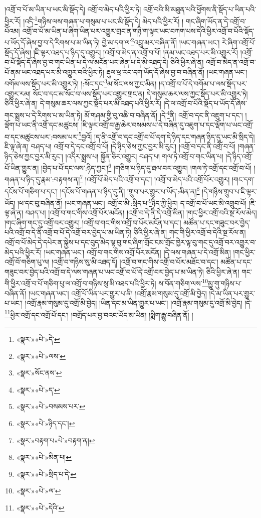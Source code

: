 །འགྲོ་བ་པོ་མ་ཡིན་པ་ཡང་མི་སྡོད་དེ། འགྲོ་བ་མེད་པའི་ཕྱིར་ཏེ། འགྲོ་བའི་མི་མཐུན་པའི་ཕྱོགས་ནི་སྡོད་པ་ཡིན་པའི་ཕྱིར་རོ། །འདི་\footnote{«སྣར་»«པེ་»དེ་}གཉིས་ལས་གཞན་པ་གསུམ་པ་ཡང་མི་སྡོད་དེ། མེད་པའི་ཕྱིར་རོ། །
གང་ཞིག་ཡོད་ན་དེ་འགྲོ་བ་པོའམ། འགྲོ་བ་པོ་མ་ཡིན་པ་ཞིག་ཡིན་པར་འགྱུར་གྲང་ན་གཉི་ག་ལྟར་ཡང་བཀག་པས་དེའི་ཕྱིར་འགྲོ་བ་པོའི་སྡོད་པ་ཡོད་དོ་ཞེས་བྱ་བ་དེ་རིགས་པ་མ་ཡིན་ཏེ། བྱེ་མ་དག་ལ་\footnote{«སྣར་»«པེ་»ལས་}འབྲུ་མར་བཞིན་ནོ། །ཡང་གཞན་ཡང་། རེ་ཞིག་འགྲོ་པོ་སྡོད་དོ་ཞེས། །ཇི་ལྟར་འཐད་པ་ཉིད་དུ་འགྱུར། །འགྲོ་བ་མེད་ན་འགྲོ་བ་པོ། །ནམ་ཡང་འཐད་པར་མི་འགྱུར་རོ། །འགྲོ་བ་པོ་སྡོད་དོ་ཞེས་བྱ་བ་གང་ཡིན་པ་དེ་ལ་མངོན་པར་ཞེན་པ་དེ་མི་འཐད་དེ། ཅིའི་ཕྱིར་ཞེ་ན། འགྲོ་བ་མེད་ན་འགྲོ་བ་པོ་ནམ་ཡང་འཐད་པར་མི་འགྱུར་བའི་ཕྱིར་ཏེ། རྡུལ་ཕྲ་རབ་དག་ཡོད་དོ་ཞེས་བྱ་བ་བཞིན་ནོ། །ཡང་གཞན་ཡང་། བགོམ་ལས་སྡོད་པར་མི་འགྱུར་ཏེ། །:སོང་དང་\footnote{«སྣར་»སོང་ནས་}མ་སོང་ལས་ཀྱང་མིན། །ད་འགྲོ་བ་པོ་དེ་བགོམ་པ་ལས་སྡོད་པར་འགྱུར་རམ། སོང་བ་དང་མ་སོང་བ་ལས་སྡོད་པར་འགྱུར་གྲང་ན། དེ་གསུམ་ཆར་ལས་ཀྱང་སྡོད་པར་མི་འགྱུར་ཏེ། ཅིའི་ཕྱིར་ཞེ་ན། དེ་གསུམ་ཆར་ལས་ཀྱང་སྡོད་པར་མི་འཐད་པའི་ཕྱིར་རོ། །དེ་ལ་འགྲོ་བ་པོའི་སྡོད་པ་ཡོད་དོ་ཞེས་གང་སྨྲས་པ་དེ་རིགས་པ་མ་ཡིན་ཏེ། མོ་གཤམ་གྱི་བུ་འཆི་བ་བཞིན་ནོ། །དེ་\footnote{«སྣར་»«པེ་»ད་}ནི། འགྲོ་བ་དང་ནི་འཇུག་པ་དང་། །ལྡོག་པ་ཡང་ནི་འགྲོ་དང་མཚུངས། །ཇི་ལྟར་འགྲོ་བ་རྒྱ་ཆེར་བསམས་པ་དེ་བཞིན་དུ་འཇུག་པ་དང་ལྡོག་པ་ཡང་འགྲོ་བ་དང་མཚུངས་པར་:བསམ་པར་\footnote{«སྣར་»«པེ་»བསམས་པར་}བྱའོ། །ད་ནི་འགྲོ་བ་དང་འགྲོ་བ་པོ་དག་དེ་ཉིད་དང་གཞན་ཉིད་དུ་ཡང་མི་སྲིད་དེ། ཇི་ལྟ་ཞེ་ན། བཤད་པ། འགྲོ་བ་དེ་དང་འགྲོ་བ་པོ། །དེ་ཉིད་ཅེས་ཀྱང་བྱར་མི་རུང་། །འགྲོ་བ་དང་ནི་འགྲོ་བ་པོ། །གཞན་ཉིད་ཅེས་ཀྱང་བྱར་མི་རུང་། །འདིར་སྨྲས་པ། སྐྱོན་ཅིར་འགྱུར། བཤད་པ། གལ་ཏེ་འགྲོ་བ་གང་ཡིན་པ། །དེ་ཉིད་འགྲོ་པོ་ཡིན་གྱུར་ན། །བྱེད་པ་པོ་དང་ལས་:ཉིད་ཀྱང་།\footnote{«སྣར་»«པེ་»ཉིད་དང་།} །གཅིག་པ་ཉིད་དུ་ཐལ་བར་འགྱུར། །གལ་ཏེ་འགྲོ་དང་འགྲོ་བ་པོ། །གཞན་པ་ཉིད་དུ་རྣམ་:བརྟགས་ན།\footnote{«སྣར་»བརྟག་པ«པེ་»བརྟག་ན།} །འགྲོ་པོ་མེད་པའི་འགྲོ་བ་དང་། །འགྲོ་བ་མེད་པའི་འགྲོ་པོར་འགྱུར། །གང་དག་དངོས་པོ་གཅིག་པ་དང་། །དངོས་པོ་གཞན་པ་ཉིད་དུ་ནི། །གྲུབ་པར་གྱུར་པ་ཡོད་:མིན་ན།\footnote{«སྣར་»«པེ་»མིན་པ།} །དེ་གཉིས་གྲུབ་པ་ཇི་ལྟར་ཡོད། །ཕ་དང་བུ་བཞིན་ནོ། །ཡང་གཞན་ཡང་། འགྲོ་བ་མི་:སྲིད་པ་\footnote{«སྣར་»«པེ་»སྲིད་པ་དེ་}ཉིད་ཀྱི་ཕྱིར། ད་འགྲོ་བ་པོ་ཡང་མི་འགྲུབ་པོ། །ཇི་ལྟ་ཞེ་ན། བཤད་པ། །འགྲོ་བ་གང་གིས་འགྲོ་པོར་མངོན། །འགྲོ་བ་དེ་ནི་དེ་འགྲོ་མིན། །གང་ཕྱིར་འགྲོ་བའི་སྔ་རོལ་མེད། །གང་ཞིག་གང་དུ་འགྲོ་བར་འགྱུར། །འགྲོ་བ་གང་གིས་འགྲོ་བ་པོར་མངོན་པ་དང་། མཚོན་པ་དང་གཟུང་བར་བྱེད་པའི་འགྲོ་བ་དེ་ནི་འགྲོ་བ་པོ་དེ་འགྲོ་བར་བྱེད་པ་མ་ཡིན་ཏེ། ཅིའི་ཕྱིར་ཞེ་ན། གང་གི་ཕྱིར་འགྲོ་བ་དེའི་སྔ་རོལ་ན། འགྲོ་བ་པོ་མེད་དེ་དཔེར་ན་སྐྱེས་པ་དང་བུད་མེད་ལྟ་བུ་གང་ཞིག་གྲོང་ངམ་གྲོང་ཁྱེར་ལྟ་བུ་གང་དུ་འགྲོ་བར་འགྱུར་བ་མེད་པའི་ཕྱིར་རོ། །ཡང་གཞན་ཡང་། འགྲོ་བ་གང་གིས་འགྲོ་པོར་མངོན། །དེ་ལས་གཞན་པ་དེ་འགྲོ་མིན། །གང་ཕྱིར་འགྲོ་བོ་གཅིག་པུ་ལ། །འགྲོ་བ་གཉིས་སུ་མི་འཐད་དོ། །འགྲོ་བ་གང་གིས་འགྲོ་བ་པོར་མཐོང་བ་དང་། མཚོན་པ་དང་གཟུང་བར་བྱེད་པའི་འགྲོ་བ་དེ་ལས་གཞན་པ་ཡང་འགྲོ་བ་པོ་དེ་འགྲོ་བར་བྱེད་པ་མ་ཡིན་ཏེ། ཅིའི་ཕྱིར་ཞེ་ན། གང་གི་ཕྱིར་འགྲོ་བ་པོ་གཅིག་པུ་ལ་འགྲོ་བ་གཉིས་སུ་མི་འཐད་པའི་ཕྱིར་ཏེ། ས་བོན་གཅིག་ལས་\footnote{«སྣར་»«པེ་»ལ་}མྱུ་གུ་གཉིས་པ་བཞིན་ནོ། །ཡང་གཞན་ཡང་། འགྲོ་པོ་ཡིན་པར་གྱུར་པ་ནི། །འགྲོ་རྣམ་གསུམ་དུ་འགྲོ་མི་བྱེད། །དེ་མ་ཡིན་པར་གྱུར་པ་ཡང་། །འགྲོ་རྣམ་གསུམ་དུ་འགྲོ་མི་བྱེད། །ཡིན་དང་མ་ཡིན་གྱུར་པ་ཡང་། །འགྲོ་རྣམ་གསུམ་དུ་འགྲོ་མི་བྱེད། །དེ་\footnote{«སྣར་»«པེ་»དེའི་}ཕྱིར་འགྲོ་དང་འགྲོ་པོ་དང་། །བགྲོད་པར་བྱ་བའང་ཡོད་མ་ཡིན། །སྨིག་རྒྱུ་བཞིན་ནོ། །
